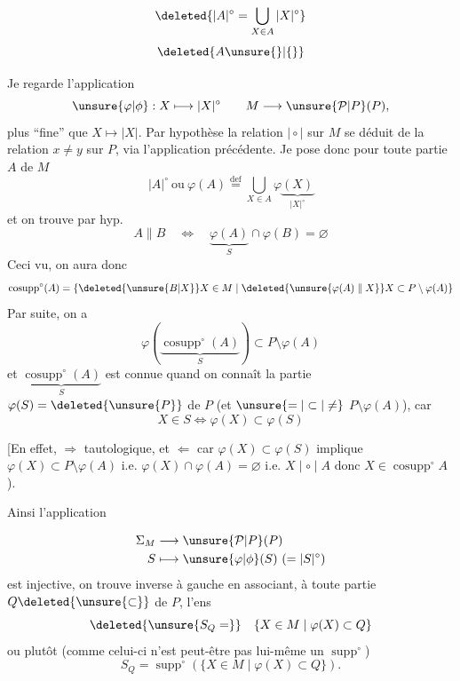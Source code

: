 \[
\deleted{|A|^{\circ}=\bigcup_{X\in A}|X|^{\circ}}
\]
\[
\deleted{A\unsure{\}|\{}}
\]

Je regarde l'application
\[
 \unsure{\varphi|\phi}:X\longmapsto|X|^{\circ}\qquad M\longrightarrow\unsure{\mathcal{P}|P}(P),
\]
plus ``fine'' que $X\longmapsto|X|$. Par hypothèse la relation $\mid\circ\mid$ sur $M$ se déduit de la  relation $x\ne y$ sur $P$, via l'application précédente. Je pose donc pour toute partie $A$ de $M$
\[
 |A|^{\circ}\ \text{ou}\ \varphi(A)\overset{\mathrm{def}}{=}\bigcup_{X\in A}\varphi\underbrace{(X)}_{|X|^{\circ}}
\]
et on trouve par hyp.
\[
 A\mathrel{\|}B\quad\Longleftrightarrow\quad\underbrace{\varphi(A)}_{S}\cap\varphi(B)=\varnothing
\]
Ceci vu, on aura donc
\[
 \operatorname{cosupp}^{\circ}(A)=\{\deleted{\unsure{B|X}}X\in M\mid\deleted{\unsure{\varphi(A)\mathrel{\|}X}}X\subset P\setminus\varphi(A)\}
\]
Par suite, on a
\[
 \varphi(\underbrace{\operatorname{cosupp}^{\circ}(A)}_{S})\subset P\setminus\varphi(A)
\]
et  $\underbrace{\operatorname{cosupp}^{\circ}(A)}_{S}$ est connue quand on connaît  la partie $\varphi(S)=\deleted{\unsure{P}}$ de $P$ (et $\unsure{=|\subset|\ne}$  $P\setminus\varphi(A)$), car
\[
 X\in S\Longleftrightarrow\varphi(X)\subset\varphi(S)
\]

[En effet, $\Rightarrow$ tautologique, et $\Leftarrow$ car $\varphi(X)\subset\varphi(S)$ implique $\varphi(X)\subset P\setminus\varphi(A)$ i.e. $\varphi(X)\cap\varphi(A)=\varnothing$ i.e. $X\mid\circ\mid A$ donc $X\in\operatorname{cosupp}^{\circ}A$).

Ainsi l'application

\[
\begin{aligned}
 \Sigma_M&\longrightarrow\unsure{\mathcal{P}|P}(P)\\
 S&\longmapsto\unsure{\varphi|\phi}(S)\ (=|S|^{\circ})
\end{aligned}
\]
est injective, on trouve  inverse à gauche en associant, à toute partie $Q\deleted{\unsure{\subset}}$ de $P$, l'ens
\[
 \deleted{\unsure{S_Q=}}\quad\{X\in M\mid\varphi(X)\subset Q\}
\]
ou plutôt (comme celui-ci n'est peut-être pas lui-même un $\operatorname{supp}^{\circ}$)
\[
 S_Q=\operatorname{supp}^{\circ}(\{X\in M\mid\varphi(X)\subset Q\}).
\]

